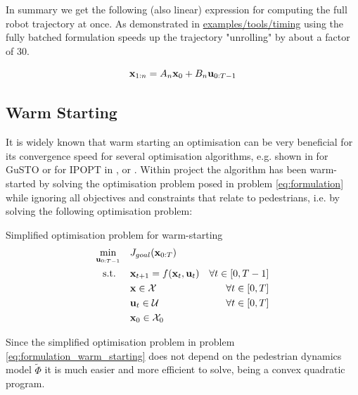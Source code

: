 In summary we get the following (also linear) expression for computing the full robot trajectory at once. As demonstrated in \href{https://github.com/simon-schaefer/mantrap/blob/master/examples/tools/timing.ipynb}{examples/tools/timing} using the fully batched formulation speeds up the trajectory "unrolling" by about a factor of 30.  

\begin{equation}
\mathbf{x}_{1:n} = A_n \mathbf{x}_0 + B_n \mathbf{u}_{0:T-1}
\label{eq:dynamics_stacked}
\end{equation}

\subsection{Warm Starting}
\label{text:approach/runtime/warm_starting}
It is widely known that warm starting an optimisation can be very beneficial for its convergence speed for several optimisation algorithms, e.g. shown in \cite{Banerjee2020} for \ac{GuSTO} or for \ac{IPOPT} in \cite{Shahzad2010}, \cite{John2008} or \cite{Spielberge2019}.
\newline
Within project \project the algorithm has been warm-started by solving the optimisation problem posed in problem \ref{eq:formulation} while ignoring all objectives and constraints that relate to pedestrians, i.e. by solving the following optimisation problem: \\

\begin{problem}{Simplified \project optimisation problem for warm-starting}
\begin{align}
\min_{\mathbf{u}_{0:T-1}} \quad & J_{goal}(\mathbf{x}_{0:T}) \\
\textrm{s.t. } \quad & \mathbf{x}_{t+1} = f(\mathbf{x}_t, \mathbf{u}_t) & \forall t \in [0, T - 1] \\
& \mathbf{x} \in \mathcal{X} & \forall t \in [0, T]\\
& \mathbf{u}_t \in \mathcal{U} & \forall t \in [0, T]\\
& \mathbf{x}_0 \in \mathcal{X}_0
\end{align} 
\label{eq:formulation_warm_starting}
\end{problem}

Since the simplified optimisation problem in problem \ref{eq:formulation_warm_starting} does not depend on the pedestrian dynamics model $\tilde{\Phi}$ it is much easier and more efficient to solve, being a convex quadratic program. \\


